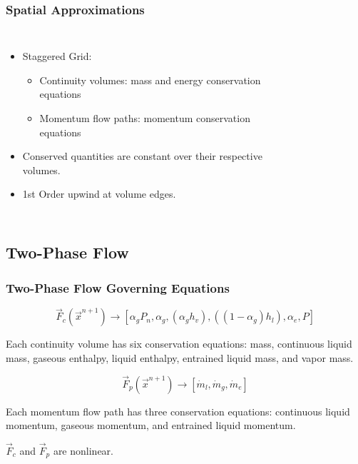 \documentclass[compress,xcolor=table]{beamer}
\newlength{\hpw}
\begin{document}
\begin{frame}
\frametitle{Spatial Approximations}

\begin{columns}
\column{\hpw}

\begin{itemize}
\item{Staggered Grid:
\begin{itemize}
\item{Continuity volumes: mass and energy conservation equations}
\item{Momentum flow paths: momentum conservation equations}
\end{itemize}
}
\item{Conserved quantities are constant over their respective volumes.}
\item{1st Order upwind at volume edges.}
\end{itemize}


\column{\hpw}
\begin{figure}
\centering
\resizebox{\textwidth}{!}{

}
\end{figure}
\end{columns}

\end{frame}
\subsection[Two-Phase Flow]{Two-Phase Flow}
\begin{frame}
\frametitle{Two-Phase Flow Governing Equations}

\begin{equation*}
\vec{F}_{c}(\vec{x}^{n+1}) \rightarrow \left[\alpha_{g} P_{n},\alpha_{g}, (\alpha_{g} h_{v}), ((1-\alpha_{g})h_{l}), \alpha_{e}, P\right]
\end{equation*}

Each continuity volume has six conservation equations: \ncg{} mass, continuous liquid mass, gaseous enthalpy, liquid enthalpy, entrained liquid mass, and vapor mass.

\begin{equation*}
\vec{F}_{p}(\vec{x}^{n+1}) \rightarrow \left[\dot{m}_{l}, \dot{m}_{g}, \dot{m}_{e} \right]
\end{equation*}

Each momentum flow path has three conservation equations:
continuous liquid momentum, gaseous momentum, and entrained liquid momentum.

\begin{center}
$\vec{F}_{c}$ and $\vec{F}_{p}$ are nonlinear.
\end{center} 

\end{frame}
\end{document}
